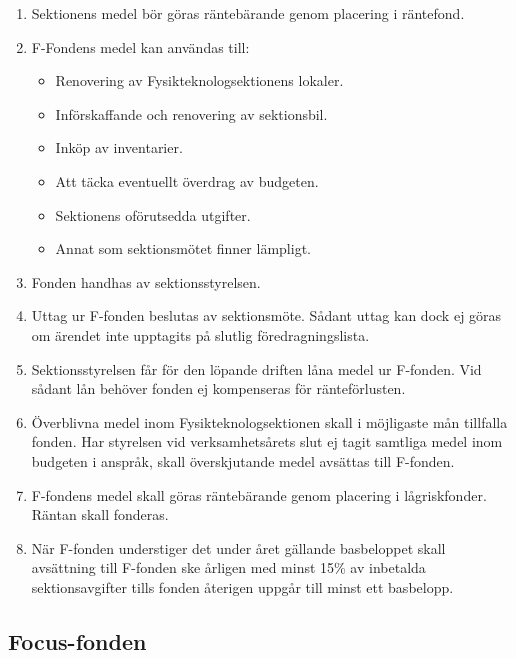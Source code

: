 \documentclass[11pt,a4paper]{article}
\begin{document}
\begin{enumerate}[\thesubsection .1]

  \item Sektionens medel bör göras räntebärande genom placering i
  rän\-te\-fond.

  \item F-Fondens medel kan användas till:
    \begin{itemize}
      \item Renovering av Fysikteknologsektionens lokaler.
      \item Införskaffande och renovering av sektionsbil.
      \item Inköp av inventarier.
      \item Att täcka eventuellt överdrag av budgeten.
      \item Sektionens oförutsedda utgifter.
      \item Annat som sektionsmötet finner lämpligt.
    \end{itemize}

  \item Fonden handhas av sektionsstyrelsen.

  \item Uttag ur F-fonden beslutas av sektionsmöte. Sådant uttag kan
  dock ej göras om ärendet inte upptagits på slutlig
  föredragningslista.

  \item Sektionsstyrelsen får för den löpande driften låna medel ur
  F-fonden. Vid sådant lån behöver fonden ej kompenseras för
  ränteförlusten.

  \item Överblivna medel inom Fysikteknologsektionen skall i möjligaste mån
  tillfalla fonden. Har styrelsen vid verksamhetsårets slut ej tagit
  samtliga medel inom budgeten i anspråk, skall överskjutande medel
  avsättas till F-fonden.

  \item F-fondens medel skall göras räntebärande genom placering i
  låg\-risk\-fond\-er. Räntan skall fonderas.

  \item När F-fonden understiger det under året gällande basbeloppet
  skall avsättning till F-fonden ske årligen med minst 15\% av
  inbetalda sektionsavgifter tills fonden återigen uppgår till minst
  ett basbelopp.

\end{enumerate}

\subsection{Focus-fonden}
\end{document}
